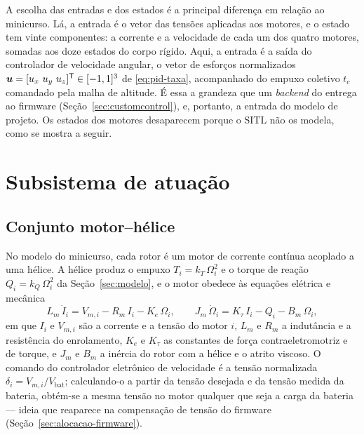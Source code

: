 A escolha das entradas e dos estados é a principal diferença em relação ao
minicurso. Lá, a entrada é o vetor das tensões aplicadas aos motores, e o
estado tem vinte componentes: a corrente e a velocidade de cada um dos quatro
motores, somadas aos doze estados do corpo rígido. Aqui, a entrada é a saída
do controlador de velocidade angular, o vetor de esforços normalizados
$\vetor{u} = [u_x\ u_y\ u_z]^{\mathsf{T}} \in [-1, 1]^3$ de
\eqref{eq:pid-taxa}, acompanhado do empuxo coletivo $t_c$ comandado pela malha
de altitude. É essa a grandeza que um \textit{backend} do
 entrega ao firmware (Seção~\ref{sec:customcontrol}),
e, portanto, a entrada do modelo de projeto. Os estados dos motores
desaparecem porque o SITL não os modela, como se mostra a seguir.

\section{Subsistema de atuação}
\label{sec:atuacao}

\subsection{Conjunto motor--hélice}
\label{sec:motor-helice}

No modelo do minicurso, cada rotor é um motor de corrente contínua acoplado a
uma hélice. A hélice produz o empuxo $T_i = k_T\,\Omega_i^2$ e o torque de
reação $Q_i = k_Q\,\Omega_i^2$ da Seção~\ref{sec:modelo}, e o motor obedece
às equações elétrica e mecânica~\cite{fischer2025}
\begin{equation}
L_m\,\dot I_i = V_{m,i} - R_m\,I_i - K_e\,\Omega_i, \qquad
J_m\,\dot\Omega_i = K_\tau\,I_i - Q_i - B_m\,\Omega_i,
\label{eq:motor-cc}
\end{equation}
em que $I_i$ e $V_{m,i}$ são a corrente e a tensão do motor $i$, $L_m$ e $R_m$
a indutância e a resistência do enrolamento, $K_e$ e $K_\tau$ as constantes de
força contraeletromotriz e de torque, e $J_m$ e $B_m$ a inércia do rotor com
a hélice e o atrito viscoso. O comando do controlador eletrônico de
velocidade é a tensão normalizada $\delta_i = V_{m,i}/V_{\mathrm{bat}}$;
calculando-o a partir da tensão desejada e da tensão medida da bateria, obtém-se
a mesma tensão no motor qualquer que seja a carga da
bateria~\cite{fischer2025} --- ideia que reaparece na compensação de tensão do
firmware (Seção~\ref{sec:alocacao-firmware}).

